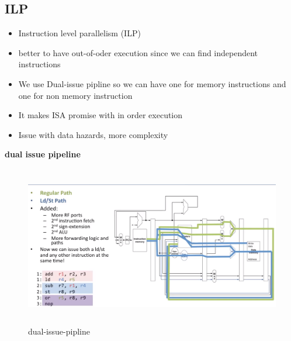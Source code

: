 \subsection{ILP}
\begin{itemize}
\item  Instruction level parallelism (ILP)
\item  better to have out-of-oder execution since we can find independent instructions
\item  We use Dual-issue pipline so we can have one for memory instructions and
  one for non memory instruction
\item  It makes ISA promise with in order execution
\item  Issue with data hazards, more complexity
\end{itemize}


\textbf{dual issue pipeline}
\begin{figure}[h]
    \vspace{10mm}
    \centering
    \includegraphics[width=16cm, height=7cm]{image/dual-issue-pipline.png}
    \caption{dual-issue-pipline}
\end{figure}

